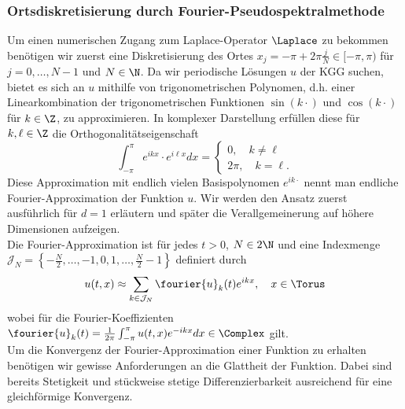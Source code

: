\subsubsection*{Ortsdiskretisierung durch Fourier-Pseudospektralmethode}
Um einen numerischen Zugang zum Laplace-Operator $\Laplace$ zu bekommen benötigen wir zuerst eine Diskretisierung des Ortes $x_j=-\pi+2\pi\frac{j}{N}\in [-\pi,\pi)$ für $j=0,\dots,N-1$ und $N\in\N$. Da wir periodische Lösungen $u$ der KGG suchen, bietet es sich an $u$ mithilfe von trigonometrischen Polynomen, d.h. einer Linearkombination der trigonometrischen Funktionen $\sin(k\cdot)$ und $\cos(k\cdot)$ für $k\in\Z$, zu approximieren. In komplexer Darstellung erfüllen diese für $k,\ell\in\Z$ die Orthogonalitätseigenschaft 
\[\int_{-\pi}^\pi e^{ikx}\cdot e^{i\ell x}dx=\begin{cases}0,\quad k\ne \ell\\ 2\pi,\quad k=\ell.\end{cases}\]
Diese Approximation mit endlich vielen Basispolynomen $e^{ik\cdot}$ nennt man endliche Fourier-Approximation der Funktion $u$. Wir werden den Ansatz zuerst ausführlich für $d=1$ erläutern und später die Verallgemeinerung auf höhere Dimensionen aufzeigen.\\
Die Fourier-Approximation ist für jedes $t>0$, $N\in 2\N$ und eine Indexmenge $\mathcal{J}_N=\left\lbrace -\frac{N}{2},\dots,-1,0,1,\dots,\frac{N}{2}-1\right\rbrace$ definiert durch
\begin{equation}
\label{eqn:fourier_approx}
u(t,x)\approx \sum_{k\in\mathcal{J}_N}\fourier{u}_k(t)e^{ikx}, \quad x\in\Torus
\end{equation}
wobei für die Fourier-Koeffizienten $\fourier{u}_k(t)=\frac{1}{2\pi}\int_{-\pi}^\pi u(t,x)e^{-ikx}dx\in\Complex$ gilt. \\
Um die Konvergenz der Fourier-Approximation einer Funktion zu erhalten benötigen wir gewisse Anforderungen an die Glattheit der Funktion. Dabei sind bereits Stetigkeit und stückweise stetige Differenzierbarkeit ausreichend für eine gleichförmige Konvergenz. 
